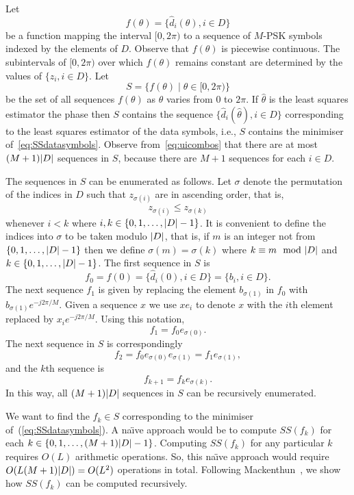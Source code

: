 \documentclass[journal]{IEEEtran}
\begin{document}
Let 
\[
f(\theta) = \{ \hat{d}_i(\theta), i \in D \}
\]
be a function mapping the interval $[0, 2\pi)$ to a sequence of $M$-PSK symbols indexed by the elements of $D$.  Observe that $f(\theta)$ is piecewise continuous.  The subintervals of $[0, 2\pi)$ over which $f(\theta)$ remains constant are determined by the values of $\{z_i, i \in D\}$.  Let
\[
S = \{ f(\theta) \mid \theta \in [0, 2 \pi) \}
\]
be the set of all sequences $f(\theta)$ as $\theta$ varies from $0$ to $2\pi$.  If $\hat{\theta}$ is the least squares estimator the phase then $S$ contains the sequence $\{ \hat{d}_i(\hat{\theta}), i \in D \}$ corresponding to the least squares estimator of the data symbols, i.e., $S$ contains the minimiser of~\eqref{eq:SSdatasymbols}.  Observe from~\eqref{eq:uicombos} that there are at most $(M+1){\left\vert D \right\vert}$ sequences in $S$, because there are $M+1$ sequences for each $i \in D$.

The sequences in $S$ can be enumerated as follows.  Let $\sigma$ denote the permutation of the indices in $D$ such that $z_{\sigma(i)}$ are in ascending order, that is,
\begin{equation}\label{eq:sigmasortind}
z_{\sigma(i)} \leq z_{\sigma(k)}
\end{equation}
whenever $i < k $ where $i, k \in \{0, 1, \dots, {\left\vert D \right\vert}-1\}$.  It is convenient to define the indices into $\sigma$ to be taken modulo ${\left\vert D \right\vert}$, that is, if $m$ is an integer not from $\{0, 1, \dots, {\left\vert D \right\vert}-1\}$ then we define $\sigma(m) = \sigma(k)$ where $k \equiv m \mod \abs{D}$ and $k \in  \{0, 1, \dots, {\left\vert D \right\vert}-1\}$.  The first sequence in $S$ is 
\[
f_0 = f(0) = \{ \hat{d}_i(0), i \in D \} = \{ b_i, i \in D \}.
\]  
The next sequence $f_1$ is given by replacing the element $b_{\sigma(1)}$ in $f_0$ with $b_{\sigma(1)}e^{-j2\pi/M}$.  Given a sequence $x$ we use $x e_i$ to denote $x$ with the $i$th element replaced by $x_i e^{-j2\pi/M}$.  Using this notation,  
\[
f_1 = f_0 e_{\sigma(0)}.
\] 
The next sequence in $S$ is correspondingly 
\[
f_2 = f_0 e_{\sigma(0)} e_{\sigma(1)} = f_1 e_{\sigma(1)},
\]
and the $k$th sequence is
\begin{equation}\label{eq:fkrec}
f_{k+1} = f_{k} e_{\sigma(k)}.
\end{equation}
In this way, all $(M+1){\left\vert D \right\vert}$ sequences in $S$ can be recursively enumerated.

We want to find the $f_k \in S$ corresponding to the minimiser of~(\ref{eq:SSdatasymbols}).  A na\"{\i}ve approach would be to compute $SS(f_k)$ for each $k \in \{0,1,\dots,(M+1){\left\vert D \right\vert}-1\}$.  Computing $SS(f_k)$ for any particular $k$ requires $O(L)$ arithmetic operations.  So, this na\"{\i}ve approach would require $O(L (M+1) {\left\vert D \right\vert}) = O(L^2)$ operations in total.  Following Mackenthun~\cite{Mackenthun1994}, we show how $SS(f_k)$ can be computed recursively.
\end{document}
